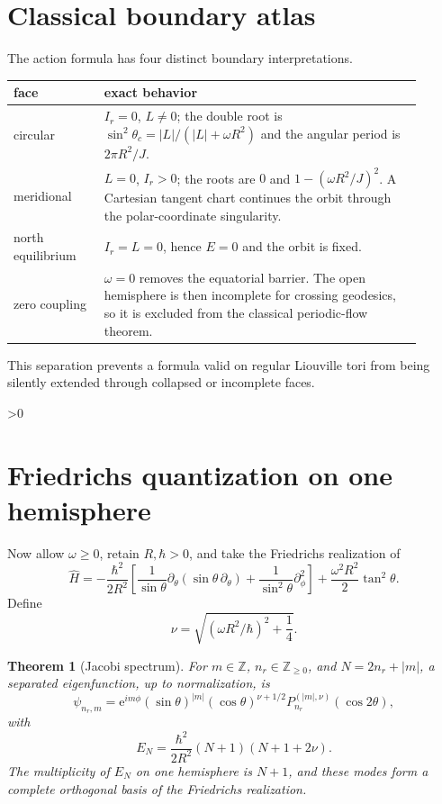 \documentclass[10pt]{article}
\newcommand{\ZZ}{\mathbb Z}
\newcommand{\e}{\mathrm e}
\newtheorem{theorem}{Theorem}
\begin{document}
\section{Classical boundary atlas}
The action formula has four distinct boundary interpretations.
\begin{center}
\begin{tabular}{p{0.20\linewidth}p{0.70\linewidth}}
\toprule
face & exact behavior\\
\midrule
circular & $I_r=0$, $L\ne0$; the double root is
$\sin^2\theta_c=|L|/(|L|+\omega R^2)$ and the angular period is
$2\pi R^2/J$.\\
meridional & $L=0$, $I_r>0$; the roots are $0$ and
$1-(\omega R^2/J)^2$.  A Cartesian tangent chart continues the orbit through
the polar-coordinate singularity.\\
north equilibrium & $I_r=L=0$, hence $E=0$ and the orbit is fixed.\\
zero coupling & $\omega=0$ removes the equatorial barrier.  The open
hemisphere is then incomplete for crossing geodesics, so it is excluded from
the classical periodic-flow theorem.\\
\bottomrule
\end{tabular}
\end{center}
This separation prevents a formula valid on regular Liouville tori from being
silently extended through collapsed or incomplete faces.

\ifnum\CRevisionRound>0
\section{Friedrichs quantization on one hemisphere}
Now allow $\omega\geq0$, retain $R,\hbar>0$, and take the Friedrichs
realization of
\begin{equation}
 \widehat H=-\frac{\hbar^2}{2R^2}
 [\frac1{\sin\theta}\partial_\theta
 (\sin\theta\,\partial_\theta)
 +\frac1{\sin^2\theta}\partial_\phi^2]
 +\frac{\omega^2R^2}{2}\tan^2\theta .       \label{eq:operator}
\end{equation}
Define
\[
 \nu=\sqrt{(\omega R^2/\hbar)^2+\frac14}.
\]

\begin{theorem}[Jacobi spectrum]
For $m\in\ZZ$, $n_r\in\ZZ_{\geq0}$, and $N=2n_r+|m|$, a separated
eigenfunction, up to normalization, is
\begin{equation}
 \psi_{n_r,m}=\e^{im\phi}(\sin\theta)^{|m|}
 (\cos\theta)^{\nu+1/2}
 P_{n_r}^{(|m|,\nu)}(\cos2\theta),             \label{eq:mode}
\end{equation}
with
\begin{equation}
 E_N=\frac{\hbar^2}{2R^2}(N+1)(N+1+2\nu).      \label{eq:energy}
\end{equation}
The multiplicity of $E_N$ on one hemisphere is $N+1$, and these modes form
a complete orthogonal basis of the Friedrichs realization.
\end{theorem}
\end{document}
